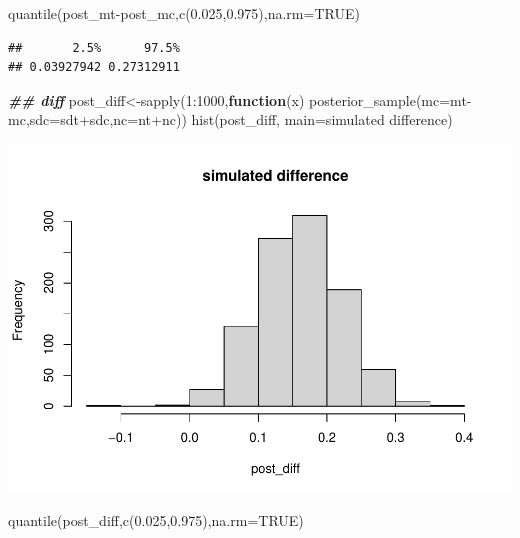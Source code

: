 \documentclass[
]{book}
\newenvironment{Shaded}{\begin{snugshade}}{\end{snugshade}}
\newcommand{\AttributeTok}[1]{\textcolor[rgb]{0.77,0.63,0.00}{#1}}
\newcommand{\ConstantTok}[1]{\textcolor[rgb]{0.00,0.00,0.00}{#1}}
\newcommand{\ControlFlowTok}[1]{\textcolor[rgb]{0.13,0.29,0.53}{\textbf{#1}}}
\newcommand{\DecValTok}[1]{\textcolor[rgb]{0.00,0.00,0.81}{#1}}
\newcommand{\DocumentationTok}[1]{\textcolor[rgb]{0.56,0.35,0.01}{\textbf{\textit{#1}}}}
\newcommand{\FloatTok}[1]{\textcolor[rgb]{0.00,0.00,0.81}{#1}}
\newcommand{\FunctionTok}[1]{\textcolor[rgb]{0.00,0.00,0.00}{#1}}
\newcommand{\NormalTok}[1]{#1}
\newcommand{\OtherTok}[1]{\textcolor[rgb]{0.56,0.35,0.01}{#1}}
\newcommand{\SpecialCharTok}[1]{\textcolor[rgb]{0.00,0.00,0.00}{#1}}
\newcommand{\StringTok}[1]{\textcolor[rgb]{0.31,0.60,0.02}{#1}}
\theoremstyle{definition}
\theoremstyle{definition}
\theoremstyle{definition}
\theoremstyle{definition}
\theoremstyle{remark}
\begin{document}
\begin{Shaded}
\begin{Highlighting}[]
         \FunctionTok{quantile}\NormalTok{(post\_mt}\SpecialCharTok{{-}}\NormalTok{post\_mc,}\FunctionTok{c}\NormalTok{(}\FloatTok{0.025}\NormalTok{,}\FloatTok{0.975}\NormalTok{),}\AttributeTok{na.rm=}\ConstantTok{TRUE}\NormalTok{)}
\end{Highlighting}
\end{Shaded}

\begin{verbatim}
##       2.5%      97.5% 
## 0.03927942 0.27312911
\end{verbatim}

\begin{Shaded}
\begin{Highlighting}[]
  \DocumentationTok{\#\# diff}
\NormalTok{         post\_diff}\OtherTok{\textless{}{-}}\FunctionTok{sapply}\NormalTok{(}\DecValTok{1}\SpecialCharTok{:}\DecValTok{1000}\NormalTok{,}\ControlFlowTok{function}\NormalTok{(x) }\FunctionTok{posterior\_sample}\NormalTok{(}\AttributeTok{mc=}\NormalTok{mt}\SpecialCharTok{{-}}\NormalTok{mc,}\AttributeTok{sdc=}\NormalTok{sdt}\SpecialCharTok{+}\NormalTok{sdc,}\AttributeTok{nc=}\NormalTok{nt}\SpecialCharTok{+}\NormalTok{nc))}
    \FunctionTok{hist}\NormalTok{(post\_diff, }\AttributeTok{main=}\StringTok{\textquotesingle{}simulated difference\textquotesingle{}}\NormalTok{)}
\end{Highlighting}
\end{Shaded}

\includegraphics{_main_files/figure-latex/unnamed-chunk-32-2.pdf}

\begin{Shaded}
\begin{Highlighting}[]
             \FunctionTok{quantile}\NormalTok{(post\_diff,}\FunctionTok{c}\NormalTok{(}\FloatTok{0.025}\NormalTok{,}\FloatTok{0.975}\NormalTok{),}\AttributeTok{na.rm=}\ConstantTok{TRUE}\NormalTok{)}
\end{Highlighting}
\end{Shaded}
\end{document}
